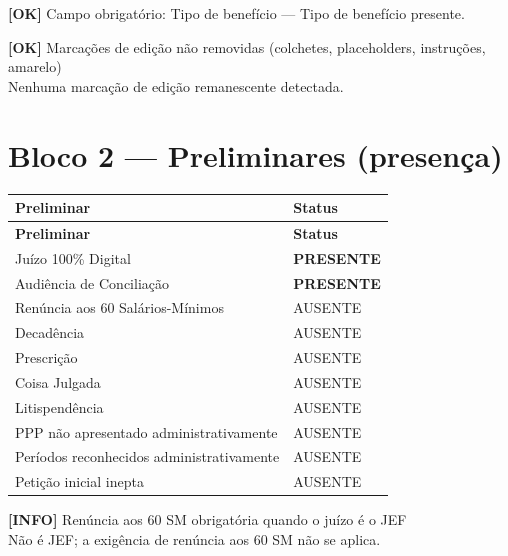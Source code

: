 \documentclass[12pt,a4paper]{article}
\newcommand{\statusOK}[1]{\textcolor{corOK}{\textbf{[OK]}} #1}
\newcommand{\statusINFO}[1]{\textcolor{corINFO}{\textbf{[INFO]}} #1}
\begin{document}
\medskip
\statusOK{Campo obrigatório: Tipo de benefício} --- Tipo de benefício presente.

\medskip
\statusOK{Marcações de edição não removidas (colchetes, placeholders, instruções, amarelo)}\\
Nenhuma marcação de edição remanescente detectada.

\section{Bloco 2 --- Preliminares (presença)}

\begin{longtable}{p{8.5cm} p{4.5cm}}
  \toprule
  \textbf{Preliminar} & \textbf{Status} \\
  \midrule
  \endfirsthead
  \toprule
  \textbf{Preliminar} & \textbf{Status} \\
  \midrule
  \endhead
  Juízo 100\% Digital                           & \textcolor{corOK}{\textbf{PRESENTE}} \\
  Audiência de Conciliação                      & \textcolor{corOK}{\textbf{PRESENTE}} \\
  Renúncia aos 60 Salários-Mínimos              & AUSENTE \\
  Decadência                                    & AUSENTE \\
  Prescrição                                    & AUSENTE \\
  Coisa Julgada                                 & AUSENTE \\
  Litispendência                                & AUSENTE \\
  PPP não apresentado administrativamente       & AUSENTE \\
  Períodos reconhecidos administrativamente     & AUSENTE \\
  Petição inicial inepta                        & AUSENTE \\
  \bottomrule
\end{longtable}

\statusINFO{Renúncia aos 60 SM obrigatória quando o juízo é o JEF}\\
Não é JEF; a exigência de renúncia aos 60 SM não se aplica.

\end{document}
